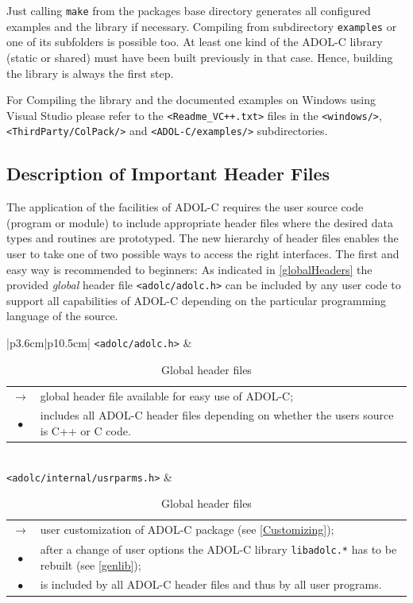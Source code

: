 \documentclass[11pt,twoside]{article}
\begin{document}
Just calling \verb=make= from the packages base directory generates
all configured examples and the library if necessary. Compiling from
subdirectory \verb=examples= or one of its subfolders is possible
too. At least one kind of the ADOL-C library (static or shared) must
have been built previously in that case. Hence, building the library
is always the first step. 

For Compiling the library and the documented examples on Windows using
Visual Studio please refer to the \verb=<Readme_VC++.txt>= files in 
the \verb=<windows/>=, \verb=<ThirdParty/ColPack/>= and 
\verb=<ADOL-C/examples/>= subdirectories.
%
\subsection{Description of Important Header Files}
\label{ssec:DesIH}
%
The application of the facilities of ADOL-C requires the user 
source code (program or module) to include appropriate 
header files where the desired data types and routines are 
prototyped. The new hierarchy of header files enables the user
to take one of two possible ways to access the right interfaces.
The first and easy way is recommended to beginners: As indicated in
\autoref{globalHeaders} the provided {\em global} header file 
\verb=<adolc/adolc.h>= can be included by any user code to support all
capabilities of ADOL-C depending on the particular programming language
of the source.    

\begin{table}[h]
\center \small
\begin{tabular}{|p{3.6cm}|p{10.5cm}|}\hline
\verb=<adolc/adolc.h>= & 
\begin{tabular*}{10.5cm}{cp{9.5cm}}
  \boldmath $\rightarrow$ \unboldmath
                 & global header file available for easy use of ADOL-C; \\
  $\bullet$      & includes all ADOL-C header files depending on
                   whether the users source is C++ or C code.
\end{tabular*}
\\ \hline
\verb=<adolc/internal/usrparms.h>= &
\begin{tabular*}{10.5cm}{cp{9.5cm}}
  \boldmath $\rightarrow$ \unboldmath
                 & user customization of ADOL-C package (see
                   \autoref{Customizing}); \\
  $\bullet$      & after a change of
                   user options the ADOL-C library \verb=libadolc.*=
                   has to be rebuilt (see \autoref{genlib}); \\
  $\bullet$      & is included by all ADOL-C header files and thus by all user
                   programs.
\end{tabular*} \\ \hline
\end{tabular}
\caption{Global header files}
\label{globalHeaders}
\end{table}  
\end{document}
